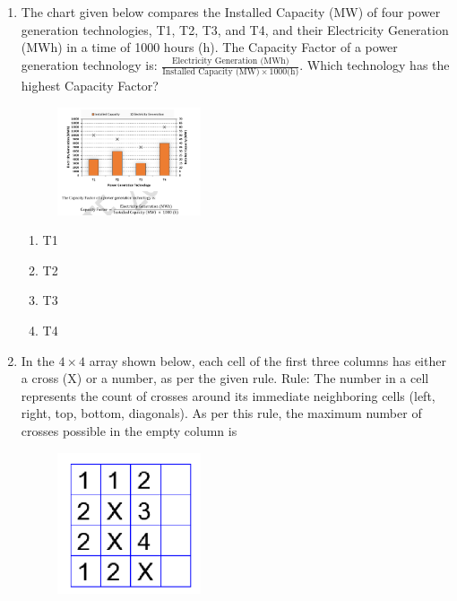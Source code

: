 \documentclass[journal,12pt,onecolumn]{IEEEtran}
\begin{document}
\begin{enumerate}
\item The chart given below compares the Installed Capacity (MW) of four power generation technologies, T1, T2, T3, and T4, and their Electricity Generation (MWh) in a time of 1000 hours (h). The Capacity Factor of a power generation technology is: $\frac{\text{Electricity Generation (MWh)}}{\text{Installed Capacity (MW)} \times 1000 \text{(h)}}$. Which technology has the highest Capacity Factor?
\begin{figure}[h!]
    \centering
    \includegraphics[width=0.4\textwidth]{figs/fig1.png}
    \caption{}
    \label{fig:q18}
\end{figure}


\hfill{}

\begin{multicols}{4}
\begin{enumerate}
    \item T1
    \item T2
    \item T3
    \item T4
\end{enumerate}
\end{multicols}

\item In the $4 \times 4$ array shown below, each cell of the first three columns has either a cross (X) or a number, as per the given rule. Rule: The number in a cell represents the count of crosses around its immediate neighboring cells (left, right, top, bottom, diagonals). As per this rule, the maximum number of crosses possible in the empty column is
\begin{figure}[h!]
    \centering
    \includegraphics[width=0.4\textwidth]{figs/fig2.png}
    \caption{}
    \label{fig:q18}
\end{figure}



\end{enumerate}
\end{document}
